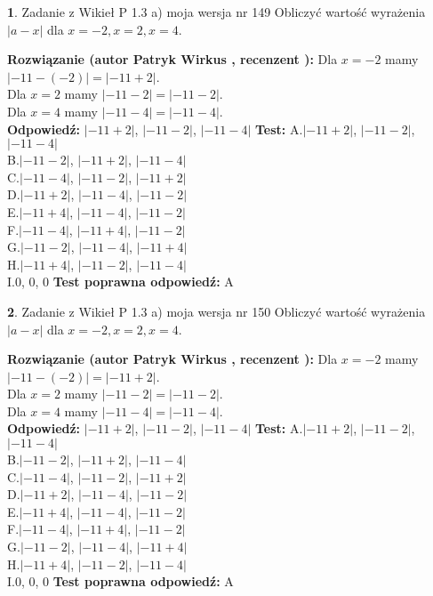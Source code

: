 \documentclass[12pt, a4paper]{article}
\theoremstyle{definition} %
\newtheorem{zad}{}
\newcommand{\zadStart}[1]{\begin{zad}#1\newline}
\newcommand{\zadStop}{\end{zad}}
\newcommand{\rozwStart}[2]{\noindent \textbf{Rozwiązanie (autor #1 , recenzent #2): }\newline}
\newcommand{\rozwStop}{\newline}
\newcommand{\odpStart}{\noindent \textbf{Odpowiedź:}\newline}
\newcommand{\odpStop}{\newline}
\newcommand{\testStart}{\noindent \textbf{Test:}\newline}
\newcommand{\testStop}{\newline}
\newcommand{\kluczStart}{\noindent \textbf{Test poprawna odpowiedź:}\newline}
\newcommand{\kluczStop}{\newline}
\begin{document}
\zadStart{Zadanie z Wikieł P 1.3 a) moja wersja nr 149}
Obliczyć wartość wyrażenia $|a - x|$ dla $x=-2,x=2,x=4$.
\zadStop
\rozwStart{Patryk Wirkus}{}
Dla $x = -2$ mamy $|-11 - (-2)| = |-11 + 2|$.\\
Dla $x = 2$ mamy $|-11 - 2| = |-11 - 2|$.\\
Dla $x = 4$ mamy $|-11 - 4| = |-11 - 4|$.\\
\rozwStop
\odpStart
$|-11 + 2|$, $|-11 - 2|$, $|-11 - 4|$
\odpStop
\testStart
A.$|-11 + 2|$, $|-11 - 2|$, $|-11 - 4|$\\
B.$|-11 - 2|$, $|-11 + 2|$, $|-11 - 4|$\\
C.$|-11 - 4|$, $|-11 - 2|$, $|-11 + 2|$\\
D.$|-11 + 2|$, $|-11 - 4|$, $|-11 - 2|$\\
E.$|-11 + 4|$, $|-11 - 4|$, $|-11 - 2|$\\
F.$|-11 - 4|$, $|-11 + 4|$, $|-11 - 2|$\\
G.$|-11 - 2|$, $|-11 - 4|$, $|-11 + 4|$\\
H.$|-11 + 4|$, $|-11 - 2|$, $|-11 - 4|$\\
I.$0$, $0$, $0$
\testStop
\kluczStart
A
\kluczStop



\zadStart{Zadanie z Wikieł P 1.3 a) moja wersja nr 150}
Obliczyć wartość wyrażenia $|a - x|$ dla $x=-2,x=2,x=4$.
\zadStop
\rozwStart{Patryk Wirkus}{}
Dla $x = -2$ mamy $|-11 - (-2)| = |-11 + 2|$.\\
Dla $x = 2$ mamy $|-11 - 2| = |-11 - 2|$.\\
Dla $x = 4$ mamy $|-11 - 4| = |-11 - 4|$.\\
\rozwStop
\odpStart
$|-11 + 2|$, $|-11 - 2|$, $|-11 - 4|$
\odpStop
\testStart
A.$|-11 + 2|$, $|-11 - 2|$, $|-11 - 4|$\\
B.$|-11 - 2|$, $|-11 + 2|$, $|-11 - 4|$\\
C.$|-11 - 4|$, $|-11 - 2|$, $|-11 + 2|$\\
D.$|-11 + 2|$, $|-11 - 4|$, $|-11 - 2|$\\
E.$|-11 + 4|$, $|-11 - 4|$, $|-11 - 2|$\\
F.$|-11 - 4|$, $|-11 + 4|$, $|-11 - 2|$\\
G.$|-11 - 2|$, $|-11 - 4|$, $|-11 + 4|$\\
H.$|-11 + 4|$, $|-11 - 2|$, $|-11 - 4|$\\
I.$0$, $0$, $0$
\testStop
\kluczStart
A
\kluczStop
\end{document}
